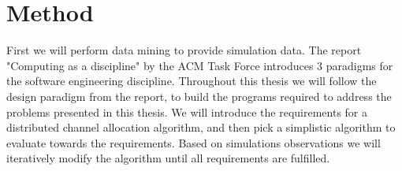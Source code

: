 %
%

\section{Method}
First we will perform data mining to provide simulation data. The report "Computing as a discipline" by the ACM Task Force \cite{Denning} introduces 3 paradigms for the software engineering discipline. Throughout this thesis we will follow the design paradigm from the report, to build the programs required to address the problems presented in this thesis. We will introduce the requirements for a distributed channel allocation algorithm, and then 
pick a simplistic algorithm to evaluate towards the requirements. Based on simulations observations we will iteratively modify the algorithm until all requirements are fulfilled. 

